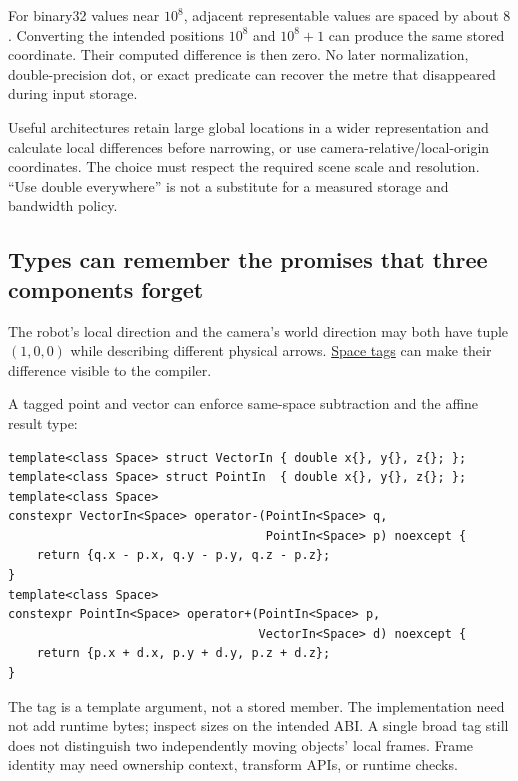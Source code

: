 \hypertarget{02-foundations-ii-ch037-large-world-coordinates-can-lose-a-small-movement-before-geometry-starts}{}

For binary32 values near \(10^8\), adjacent representable values are spaced by about \(8\). Converting the intended positions \(10^8\) and \(10^8+1\) can produce the same stored coordinate. Their computed difference is then zero. No later normalization, double-precision dot, or exact predicate can recover the metre that disappeared during input storage.

Useful architectures retain large global locations in a wider representation and calculate local differences before narrowing, or use camera-relative/local-origin coordinates. The choice must respect the required scene scale and resolution. ``Use double everywhere'' is not a substitute for a measured storage and bandwidth policy.

\subsection{Types can remember the promises that three components forget}\label{02-foundations-ii-ch037-types-can-remember-the-promises-that-three-components-forget}

\hypertarget{02-foundations-ii-ch037-types-can-remember-the-promises-that-three-components-forget}{}

The robot's local direction and the camera's world direction may both have tuple \((1,0,0)\) while describing different physical arrows. \hyperref[02-foundations-ii-ch037-types-can-remember-the-promises-that-three-components-forget]{Space tags} can make their difference visible to the compiler.

A tagged point and vector can enforce same-space subtraction and the affine result type:

\begin{verbatim}
template<class Space> struct VectorIn { double x{}, y{}, z{}; };
template<class Space> struct PointIn  { double x{}, y{}, z{}; };
template<class Space>
constexpr VectorIn<Space> operator-(PointIn<Space> q,
                                    PointIn<Space> p) noexcept {
    return {q.x - p.x, q.y - p.y, q.z - p.z};
}
template<class Space>
constexpr PointIn<Space> operator+(PointIn<Space> p,
                                   VectorIn<Space> d) noexcept {
    return {p.x + d.x, p.y + d.y, p.z + d.z};
}
\end{verbatim}

The tag is a template argument, not a stored member. The implementation need not add runtime bytes; inspect sizes on the intended ABI. A single broad  tag still does not distinguish two independently moving objects' local frames. Frame identity may need ownership context, transform APIs, or runtime checks.

